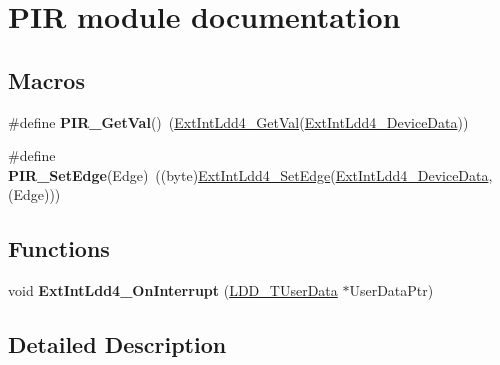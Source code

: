 \hypertarget{group___p_i_r__module}{\section{P\-I\-R module documentation}
\label{group___p_i_r__module}
}
\subsection*{Macros}
\begin{DoxyCompactItemize}
\item 
\hypertarget{group___p_i_r__module_ga365fbbd1f8da769983222b84a80c4d2c}{\#define {\bfseries P\-I\-R\-\_\-\-Get\-Val}()~(\hyperlink{group___ext_int_ldd4__module_ga6ec76062456005ea035001124d441a19}{Ext\-Int\-Ldd4\-\_\-\-Get\-Val}(\hyperlink{group___ext_int_ldd4__module_ga8783b358df665e3568cd57ea48449719}{Ext\-Int\-Ldd4\-\_\-\-Device\-Data}))}\label{group___p_i_r__module_ga365fbbd1f8da769983222b84a80c4d2c}

\item 
\hypertarget{group___p_i_r__module_ga5fe6b8aab384342d959d900f200c4e56}{\#define {\bfseries P\-I\-R\-\_\-\-Set\-Edge}(Edge)~((byte)\hyperlink{group___ext_int_ldd4__module_ga5e5afc23d4575c4a062dd514f5f8e846}{Ext\-Int\-Ldd4\-\_\-\-Set\-Edge}(\hyperlink{group___ext_int_ldd4__module_ga8783b358df665e3568cd57ea48449719}{Ext\-Int\-Ldd4\-\_\-\-Device\-Data}, (Edge)))}\label{group___p_i_r__module_ga5fe6b8aab384342d959d900f200c4e56}

\end{DoxyCompactItemize}
\subsection*{Functions}
\begin{DoxyCompactItemize}
\item 
\hypertarget{group___p_i_r__module_ga701c879b1b87783f1ed0d666ccf16347}{void {\bfseries Ext\-Int\-Ldd4\-\_\-\-On\-Interrupt} (\hyperlink{group___p_e___types__module_ga0b66a73f87238a782318aa0be7578e35}{L\-D\-D\-\_\-\-T\-User\-Data} $\ast$User\-Data\-Ptr)}\label{group___p_i_r__module_ga701c879b1b87783f1ed0d666ccf16347}

\end{DoxyCompactItemize}


\subsection{Detailed Description}
